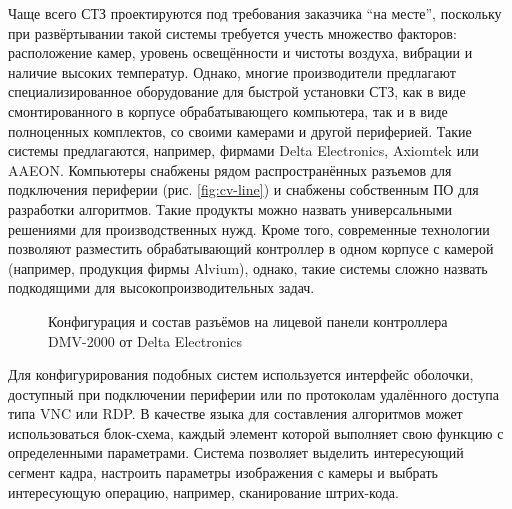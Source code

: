 Чаще всего СТЗ проектируются под требования заказчика ``на месте'', поскольку при развёртывании такой системы требуется учесть множество факторов: расположение камер, уровень освещённости и чистоты воздуха, вибрации и наличие высоких температур. Однако, многие производители предлагают специализированное оборудование для быстрой установки СТЗ, как в виде смонтированного в корпусе обрабатывающего компьютера, так и в виде полноценных комплектов, со своими камерами и другой периферией. Такие системы предлагаются, например, фирмами Delta Electronics, Axiomtek или AAEON. Компьютеры снабжены рядом распространённых разъемов для подключения периферии (рис. \cref{fig:cv-line}) и снабжены собственным ПО для разработки алгоритмов. Такие продукты можно назвать универсальными решениями для производственных нужд. Кроме того, современные технологии позволяют разместить обрабатывающий контроллер в одном корпусе с камерой (например, продукция фирмы Alvium), однако, такие системы сложно назвать подкодящими для высокопроизводительных задач.

\begin{figure}[h]
	\caption{Конфигурация и состав разъёмов на лицевой панели контроллера DMV-2000 от Delta Electronics}\label{fig:delta-el}
\end{figure}

Для конфигурирования подобных систем используется интерфейс оболочки, доступный при подключении периферии или по протоколам удалённого доступа типа VNC или RDP. В качестве языка для составления алгоритмов может использоваться блок-схема, каждый элемент которой выполняет свою функцию с определенными параметрами. Система позволяет выделить интересующий сегмент кадра, настроить параметры изображения с камеры и выбрать интересующую операцию, например, сканирование штрих-кода.

